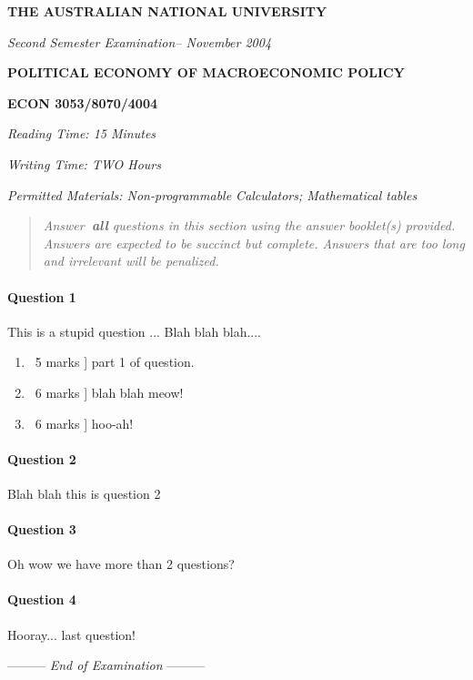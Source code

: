 \documentclass[a4paper,12pt,fleqn]{article}
\newcommand{\institution}{THE AUSTRALIAN NATIONAL UNIVERSITY}
\newcommand{\titlehd}{POLITICAL ECONOMY OF MACROECONOMIC POLICY}
\newcommand{\examtype}{Second Semester Examination}
\newcommand{\examdate}{November 2004}
\newcommand{\examcode}{ECON 3053/8070/4004}
\newcommand{\readtime}{15 Minutes}
\newcommand{\writetime}{TWO Hours}
\newcommand{\materials}{Non-programmable Calculators; Mathematical tables}
\newcommand{\lastwords}{End of Examination}
\begin{document}

\begin{center}
\large\textbf{\institution}
\end{center}
\vspace{1cm}

\begin{center}
\textit{ \examtype -- \examdate}
\end{center}
\vspace{1cm}

\begin{center}
\large\textbf{\titlehd}
\end{center}

\begin{center}
\large\textbf{\examcode}
\end{center}
\vspace{4cm}

\begin{center}
\textit{Reading Time: \readtime}
\end{center}
\begin{center}
\textit{Writing Time:  \writetime}
\end{center}
\begin{center}
\textit{Permitted Materials: \materials}
\end{center}




\newpage
\begin{quote}
\textit{Answer\textbf{\ all} questions in this section using the answer
booklet(s) provided. Answers are expected to be succinct but complete.
Answers that are too long and irrelevant will be penalized.}
\end{quote}
\bigskip
\paragraph{\textbf{Question 1}}
This is a stupid question ... Blah blah blah....
\begin{enumerate}
\item \lbrack\ 5 marks ] part 1 of question.
\item \lbrack \ 6 marks ] blah blah meow!
\item \lbrack \ 6 marks ] hoo-ah!
\end{enumerate}


\newpage
\paragraph{\textbf{Question 2}}
Blah blah this is question 2

\newpage
\paragraph{\textbf{Question 3} \ }
Oh wow we have more than 2 questions? 

\newpage
\paragraph{Question 4} Hooray... last question!


\begin{center}
\vspace{3cm}
--------- \textit{\lastwords} ---------
\end{center}


\label{finalpage}
\end{document}
